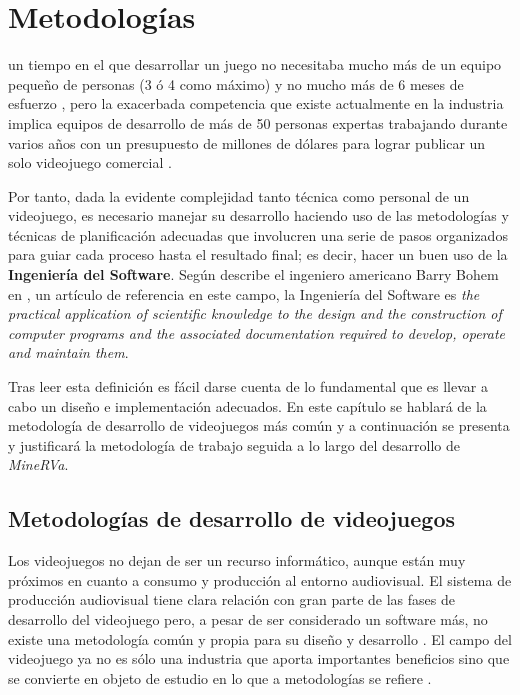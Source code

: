 \chapter{Metodologías}
\label{chap:metodologias}

 un tiempo en el que desarrollar un juego no necesitaba mucho más de un equipo pequeño de personas (3 ó 4 como máximo) y no mucho más de 6 meses de esfuerzo \cite{dill-07}, pero la exacerbada competencia que existe actualmente en la industria implica equipos de desarrollo de más de 50 personas expertas trabajando durante varios años con un presupuesto de millones de dólares para lograr publicar un solo videojuego comercial \cite{mor-10}. 

Por tanto, dada la evidente complejidad tanto técnica como personal de un videojuego, es necesario manejar su desarrollo haciendo uso de las metodologías y técnicas de planificación adecuadas que involucren una serie de pasos organizados para guiar cada proceso hasta el resultado final; es decir, hacer un buen uso de la \textbf{Ingeniería del Software}. Según describe el ingeniero americano Barry Bohem en \cite{Boe-79}, un artículo de referencia en este campo, la Ingeniería del Software es \textit{the practical application of scientific knowledge to the design and the construction of computer programs and the associated documentation required to develop, operate and maintain them}.

Tras leer esta definición es fácil darse cuenta de lo fundamental que es llevar a cabo un diseño e implementación adecuados. En este capítulo se hablará de la metodología de desarrollo de videojuegos más común y a continuación se presenta y justificará la metodología de trabajo seguida a lo largo del desarrollo de \textit{MineRVa}.

\section{Metodologías de desarrollo de videojuegos}

Los videojuegos no dejan de ser un recurso informático, aunque están muy próximos en cuanto a consumo y producción al entorno audiovisual. El sistema de producción audiovisual tiene clara relación con gran parte de las fases de desarrollo del videojuego pero, a pesar de ser considerado un software más, no existe una metodología común y propia para su diseño y desarrollo \cite{man-14}. El campo del videojuego ya no es sólo una industria que aporta importantes beneficios sino que se convierte en objeto de estudio en lo que a metodologías se refiere \cite{agu-08}.


